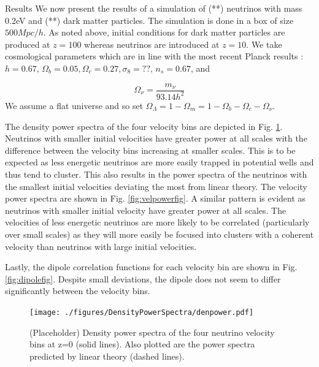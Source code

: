 \begin{section}{Results}
  \label{sec:results}
  We now present the results of a simulation of (**) neutrinos 
with mass 0.2eV and (**) dark matter particles. The simulation 
is done in a box of size $500 Mpc/h$. As noted above, initial 
conditions for dark matter particles are produced at $z=100$ 
whereas neutrinos are introduced at $z=10$. We take cosmological 
parameters which are in line with the most recent Planck results 
\cite{bib:Planck2015}: $h=0.67,\, \Omega_b=0.05, \Omega_c=0.27, 
\sigma_8=??,\, n_s=0.67 $, and

\begin{equation}
  \Omega_\nu = \frac{m_\nu}{93.14 h^2}
\end{equation}
We assume a flat universe and so set $\Omega_\Lambda=1-\Omega_m=1-\Omega_b-\Omega_c-\Omega_\nu$.

\par The density power spectra of the four velocity bins are depicted in Fig. \ref{fig:denpowerfig}.
Neutrinos with smaller initial velocities have greater power at all scales 
with the difference between the velocity bins increasing at smaller scales. 
This is to be expected as less energetic neutrinos are more easily trapped 
in potential wells and thus tend to cluster. This also results in the power 
spectra of the neutrinos with the smallest initial velocities deviating the 
most from linear theory. The velocity power spectra are shown in Fig. \ref{fig:velpowerfig}.
A similar pattern is evident as neutrinos with smaller initial velocity have
greater power at all scales. The velocities of less energetic neutrinos are
more likely to be correlated (particularly over small scales) as they will
more easily be focused into clusters with a coherent velocity than neutrinos
with large initial velocities. 

\par Lastly, the dipole correlation functions for each velocity bin are 
shown in Fig. \ref{fig:dipolefig}. Despite small deviations, the dipole
does not seem to differ significantly between the velocity bins. 

\begin{figure}[htbp]
  \begin{center}
    \texttt{[image: ./figures/DensityPowerSpectra/denpower.pdf]}
    \caption{(Placeholder) Density power spectra of the four neutrino velocity bins
	      at z=0 (solid lines). Also plotted are the power spectra predicted by
	      linear theory (dashed lines).}
    \label{fig:denpowerfig}
  \end{center}
\end{figure}


\end{section}
